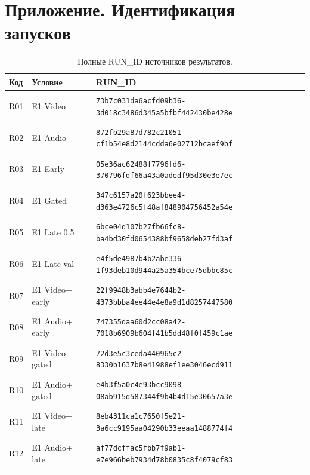 \section*{Приложение. Идентификация запусков}
\begingroup\small{}
\begin{longtable}{@{}l>{\raggedright\arraybackslash}p{3.5cm}p{10.8cm}@{}}
\caption{Полные RUN\_ID источников результатов.}\\
\toprule Код & Условие & RUN\_ID \\ \midrule \endhead
\hypertarget{R01}{R01} & E1 Video & {\fontsize{8.8}{11}\selectfont\texttt{73b7c031da6acfd09b36-3d018c3486d345a5bfbf442430be428e}} \\
\hypertarget{R02}{R02} & E1 Audio & {\fontsize{8.8}{11}\selectfont\texttt{872fb29a87d782c21051-cf1b54e8d2144cdda6e02712bcaef9bf}} \\
\hypertarget{R03}{R03} & E1 Early & {\fontsize{8.8}{11}\selectfont\texttt{05e36ac62488f7796fd6-370796fdf66a43a0adedf95d30e3e7ec}} \\
\hypertarget{R04}{R04} & E1 Gated & {\fontsize{8.8}{11}\selectfont\texttt{347c6157a20f623bbee4-d363e4726c5f48af848904756452a54e}} \\
\hypertarget{R05}{R05} & E1 Late 0.5 & {\fontsize{8.8}{11}\selectfont\texttt{6bce04d107b27fb66fc8-ba4bd30fd0654388bf9658deb27fd3af}} \\
\hypertarget{R06}{R06} & E1 Late val & {\fontsize{8.8}{11}\selectfont\texttt{e4f5de4987b4b2abe336-1f93deb10d944a25a354bce75dbbc85c}} \\
\hypertarget{R07}{R07} & E1 Video+ early & {\fontsize{8.8}{11}\selectfont\texttt{22f9948b3abb4e7644b2-4373bbba4ee44e4e8a9d1d8257447580}} \\
\hypertarget{R08}{R08} & E1 Audio+ early & {\fontsize{8.8}{11}\selectfont\texttt{747355daa60d2cc08a42-7018b6909b604f41b5dd48f0f459c1ae}} \\
\hypertarget{R09}{R09} & E1 Video+ gated & {\fontsize{8.8}{11}\selectfont\texttt{72d3e5c3ceda440965c2-8330b1637b8e41988ef1ee3046ecd911}} \\
\hypertarget{R10}{R10} & E1 Audio+ gated & {\fontsize{8.8}{11}\selectfont\texttt{e4b3f5a0c4e93bcc9098-08ab915d587344f9b4b4d15e30657a3e}} \\
\hypertarget{R11}{R11} & E1 Video+ late & {\fontsize{8.8}{11}\selectfont\texttt{8eb4311ca1c7650f5e21-3a6cc9195aa04290b33eeaa1488774f4}} \\
\hypertarget{R12}{R12} & E1 Audio+ late & {\fontsize{8.8}{11}\selectfont\texttt{af77dcffac5fbb7f9ab1-e7e966beb7934d78b0835c8f4079cf83}} \\

\end{longtable}

